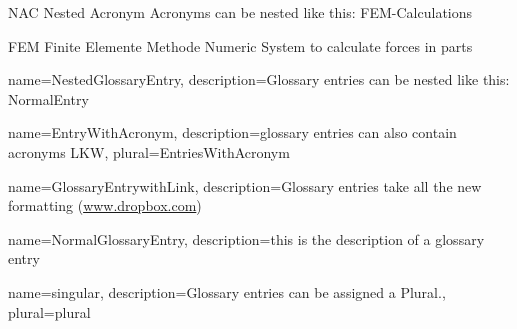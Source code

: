 


{NAC}            %
{Nested Acronym}  %
{Acronyms can be nested like this: \protect \gls{FEM}-Calculations} %


{FEM}            %
{Finite Elemente Methode}  %
{Numeric System to calculate forces in parts} %

{
	name=NestedGlossaryEntry,
	description={Glossary entries can be nested like this: \protect \gls{NormalEntry}}
}


{
	name=EntryWithAcronym,
	description={glossary entries can also contain acronyms \protect \acrfull{LKW}},
	plural={EntriesWithAcronym}

}

{
	name=GlossaryEntrywithLink,
	description={Glossary entries take all the new formatting  (\url{www.dropbox.com})}
}

{
	name=NormalGlossaryEntry,
	description={this is the description of a glossary entry}
}

{
	name=singular,
	description={Glossary entries can be assigned a Plural.},
	plural={plural}
}

